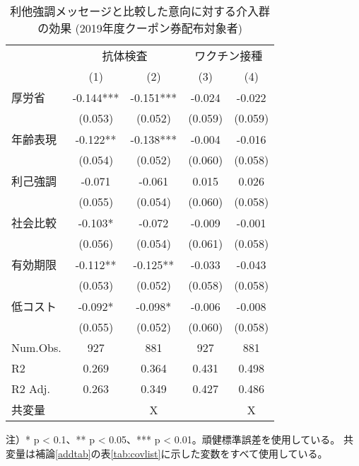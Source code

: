 \documentclass[
  11pt,
  a4paper,
]{article}
\begin{document}
\begin{table}

\caption{\label{tab:show-int-coupon1-altreg}利他強調メッセージと比較した意向に対する介入群の効果 (2019年度クーポン券配布対象者)}
\centering
\begin{threeparttable}
\begin{tabular}[t]{lcccc}
\toprule
\multicolumn{1}{c}{ } & \multicolumn{2}{c}{抗体検査} & \multicolumn{2}{c}{ワクチン接種} \\
\cmidrule(l{3pt}r{3pt}){2-3} \cmidrule(l{3pt}r{3pt}){4-5}
  & (1) & (2) & (3) & (4)\\
\midrule
厚労省 & -0.144*** & -0.151*** & -0.024 & -0.022\\
 & (0.053) & (0.052) & (0.059) & (0.059)\\
年齢表現 & -0.122** & -0.138*** & -0.004 & -0.016\\
 & (0.054) & (0.052) & (0.060) & (0.058)\\
利己強調 & -0.071 & -0.061 & 0.015 & 0.026\\
 & (0.055) & (0.054) & (0.060) & (0.058)\\
社会比較 & -0.103* & -0.072 & -0.009 & -0.001\\
 & (0.056) & (0.054) & (0.061) & (0.058)\\
有効期限 & -0.112** & -0.125** & -0.033 & -0.043\\
 & (0.053) & (0.052) & (0.058) & (0.058)\\
低コスト & -0.092* & -0.098* & -0.006 & -0.008\\
 & (0.055) & (0.052) & (0.060) & (0.058)\\
\midrule
Num.Obs. & 927 & 881 & 927 & 881\\
R2 & 0.269 & 0.364 & 0.431 & 0.498\\
R2 Adj. & 0.263 & 0.349 & 0.427 & 0.486\\
共変量 &  & X &  & X\\
\bottomrule
\end{tabular}
\begin{tablenotes}
\item 注）* p < 0.1、** p < 0.05、*** p < 0.01。頑健標準誤差を使用している。 共変量は補論\ref{addtab}の表\ref{tab:covlist}に示した変数をすべて使用している。
\end{tablenotes}
\end{threeparttable}
\end{table}
\end{document}
